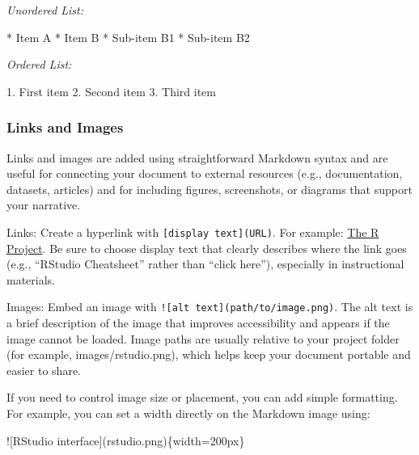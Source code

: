 \documentclass[
  11pt,
]{article}
\newenvironment{Shaded}{\begin{snugshade}}{\end{snugshade}}
\newcommand{\NormalTok}[1]{#1}
\newcommand{\SpecialStringTok}[1]{\textcolor[rgb]{0.31,0.60,0.02}{#1}}
\begin{document}
\emph{Unordered List:}

\begin{Shaded}
\begin{Highlighting}[]
\SpecialStringTok{* }\NormalTok{Item A}
\SpecialStringTok{* }\NormalTok{Item B}
\SpecialStringTok{  * }\NormalTok{Sub{-}item B1}
\SpecialStringTok{  * }\NormalTok{Sub{-}item B2}
\end{Highlighting}
\end{Shaded}

\emph{Ordered List:}

\begin{Shaded}
\begin{Highlighting}[]
\SpecialStringTok{1. }\NormalTok{First item}
\SpecialStringTok{2. }\NormalTok{Second item}
\SpecialStringTok{3. }\NormalTok{Third item}
\end{Highlighting}
\end{Shaded}

\subsubsection{Links and Images}\label{links-and-images}

Links and images are added using straightforward Markdown syntax and are
useful for connecting your document to external resources (e.g.,
documentation, datasets, articles) and for including figures,
screenshots, or diagrams that support your narrative.

Links: Create a hyperlink with \texttt{{[}display\ text{]}(URL)}. For
example: \href{https:www.r.com}{The R Project}. Be sure to choose
display text that clearly describes where the link goes (e.g., ``RStudio
Cheatsheet'' rather than ``click here''), especially in instructional
materials.

Images: Embed an image with
\texttt{!{[}alt\ text{]}(path/to/image.png)}. The alt text is a brief
description of the image that improves accessibility and appears if the
image cannot be loaded. Image paths are usually relative to your project
folder (for example, images/rstudio.png), which helps keep your document
portable and easier to share.

If you need to control image size or placement, you can add simple
formatting. For example, you can set a width directly on the Markdown
image using:

\begin{center}
![RStudio interface](rstudio.png)\{width=200px\}
\end{center}
\end{document}
